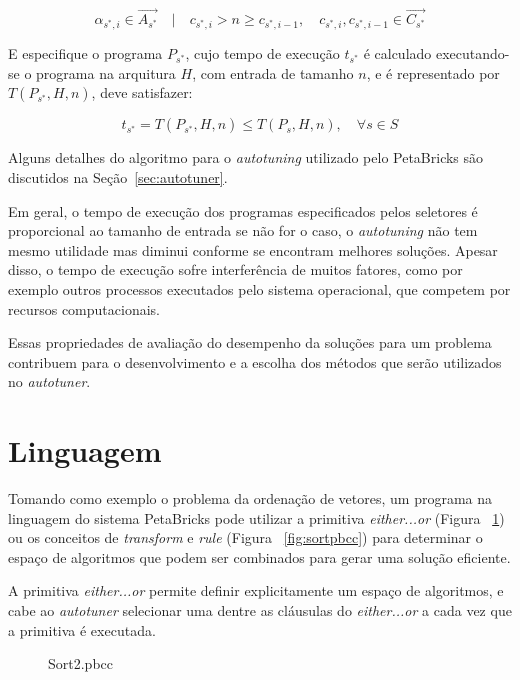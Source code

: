 \documentclass[a4paper, 11pt, twoside]{article}
\begin{document}
\begin{equation*}
    \alpha_{s^*,i} \in \overrightarrow{A_{s^*}} \quad | \quad c_{s^*,i} > n \geq c_{s^*,i-1},\quad
    c_{s^*,i}, c_{s^*,i-1} \in \overrightarrow{C_{s^*}}
\end{equation*}

E especifique o programa $P_{s^*}$, cujo tempo de execução $t_{s^*}$ é calculado
executando-se o programa na arquitura $H$, com entrada de tamanho $n$,
e é representado por $T(P_{s^*},H,n)$, deve satisfazer:

\begin{equation*}
    t_{s^*} = T(P_{s^*},H,n) \leq T(P_s,H,n), \quad \forall s \in S
\end{equation*}

Alguns detalhes do algoritmo para o \emph{autotuning} utilizado pelo PetaBricks
são discutidos na Seção~\ref{sec:autotuner}.

Em geral, o tempo de execução dos programas especificados pelos seletores
é proporcional ao tamanho de entrada \textemdash se não for o caso, o
\emph{autotuning} não tem mesmo utilidade \textemdash mas diminui conforme
se encontram melhores soluções. Apesar disso, o tempo de execução sofre
interferência de muitos fatores, como por exemplo outros processos executados
pelo sistema operacional, que competem por recursos computacionais.

Essas propriedades de avaliação do desempenho da soluções para um problema 
contribuem para o desenvolvimento e a escolha dos métodos
que serão utilizados no \emph{autotuner}.

\section{Linguagem}

Tomando como exemplo o problema da ordenação de vetores, um programa na
linguagem do sistema PetaBricks pode utilizar a primitiva \emph{either...or} 
(Figura ~\ref{fig:sort2pbcc}) ou os conceitos de \emph{transform} e \emph{rule}
(Figura ~\ref{fig:sortpbcc}) para determinar o espaço de algoritmos que podem 
ser combinados para gerar uma solução eficiente.

A primitiva \emph{either...or} permite definir explicitamente um espaço
de algoritmos, e cabe ao \emph{autotuner} selecionar uma dentre as cláusulas
do \emph{either...or} a cada vez que a primitiva é executada.

\begin{figure}[H]
    \centering
    
    \caption{Sort2.pbcc}
    \label{fig:sort2pbcc}
\end{figure}
\end{document}
